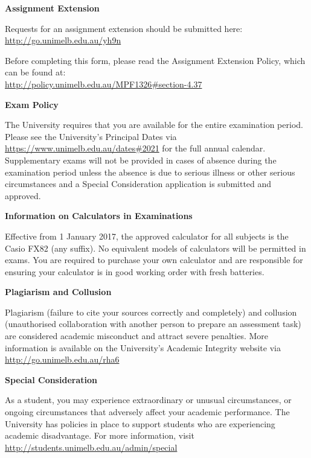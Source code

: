 \documentclass[10pt]{article}
\begin{document}
\begin{multicols}{2}
\smallskip\noindent\textbf{Assignment Extension}

\smallskip\noindent Requests for an assignment extension should be submitted here: \href{http://go.unimelb.edu.au/yh9n}{http://go.unimelb.edu.au/yh9n}

\smallskip\noindent Before completing this form, please read the Assignment Extension Policy, which can be found at:\\ \href{http://policy.unimelb.edu.au/MPF1326\#section-4.37}{http://policy.unimelb.edu.au/MPF1326\#section-4.37}





\smallskip\noindent\textbf{Exam Policy}

\smallskip\noindent The University requires that you are available for the entire examination period. Please see the University's Principal Dates via \href{https://www.unimelb.edu.au/dates\#2021}{https://www.unimelb.edu.au/dates\#2021} for the full annual calendar. Supplementary exams will not be provided in cases of absence during the examination period unless the absence is due to serious illness or other serious circumstances and a Special Consideration application is submitted and approved. 

\smallskip\noindent\textbf{Information on Calculators in Examinations}

\smallskip\noindent Effective from 1 January 2017, the approved calculator for all subjects is the Casio FX82 (any suffix). No equivalent models of calculators will be permitted in exams. 
You are required to purchase your own calculator and are responsible for ensuring your calculator is in good working order with fresh batteries.  

\smallskip\noindent\textbf{Plagiarism and Collusion}

\smallskip\noindent Plagiarism (failure to cite your sources correctly and completely) and collusion (unauthorised collaboration with another person to prepare an assessment task) are considered academic misconduct and attract severe penalties. More information is available on the University's Academic Integrity website via \href{http://go.unimelb.edu.au/rha6}{http://go.unimelb.edu.au/rha6}

\smallskip\noindent\textbf{Special Consideration}

\smallskip\noindent As a student, you may experience extraordinary or unusual circumstances, or ongoing circumstances that adversely affect your academic performance. The University has policies in place to support students who are experiencing academic disadvantage. For more information, visit \href{http://students.unimelb.edu.au/admin/special}{http://students.unimelb.edu.au/admin/special}


\end{multicols}
\end{document}
